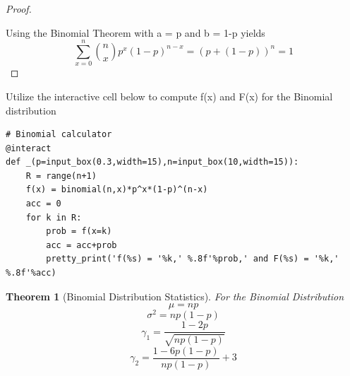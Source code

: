 \documentclass[10pt,]{book}
\theoremstyle{plain}
\newtheorem{theorem}{Theorem}[section]
\theoremstyle{definition}
\theoremstyle{definition}
\theoremstyle{definition}
\numberwithin{equation}{section}
\begin{document}
\begin{proof}\hypertarget{proof-34}{}

		Using the Binomial Theorem with a = p and b = 1-p yields
		\begin{equation*}\sum_{x=0}^n \binom{n}{x}p^x(1-p)^{n-x} = (p + (1-p))^n = 1\end{equation*}
\end{proof}
\par
Utilize the interactive cell below to compute f(x) and F(x) for the Binomial distribution%
\begin{lstlisting}[style=sageinput]
# Binomial calculator
@interact
def _(p=input_box(0.3,width=15),n=input_box(10,width=15)):
    R = range(n+1)
    f(x) = binomial(n,x)*p^x*(1-p)^(n-x)
    acc = 0
    for k in R:
        prob = f(x=k)
        acc = acc+prob
        pretty_print('f(%s) = '%k,' %.8f'%prob,' and F(%s) = '%k,' %.8f'%acc)
\end{lstlisting}
\begin{theorem}[{Binomial Distribution Statistics}]\label{theorem-34}
For the Binomial Distribution
	\begin{equation*}\mu = np\end{equation*}
	\begin{equation*}\sigma^2 = np(1-p)\end{equation*}
	\begin{equation*}\gamma_1 = \frac{1-2p}{\sqrt{np(1-p)}}\end{equation*}
	\begin{equation*}\gamma_2 = \frac{1-6p(1-p)}{np(1-p)} + 3\end{equation*}
\end{theorem}
\end{document}
